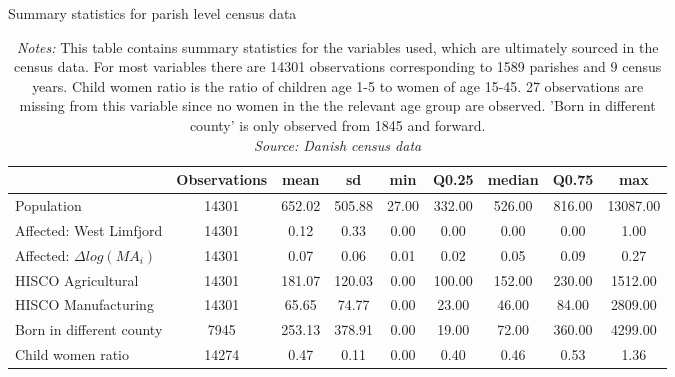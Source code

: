 \documentclass[11pt]{article}
\begin{document}
\begin{table}
\centering
\caption{Summary statistics for parish level census data}
\label{tab:desc_pop} 
\footnotesize
\begin{tabular}{lcccccccc}
\toprule
  & Observations & mean & sd & min & Q0.25 & median & Q0.75 & max\\
\midrule
Population & 14301 & 652.02 & 505.88 & 27.00 & 332.00 & 526.00 & 816.00 & 13087.00\\
Affected: West Limfjord & 14301 & 0.12 & 0.33 & 0.00 & 0.00 & 0.00 & 0.00 & 1.00\\
Affected: $\Delta log(MA_i)$ & 14301 & 0.07 & 0.06 & 0.01 & 0.02 & 0.05 & 0.09 & 0.27\\
HISCO Agricultural & 14301 & 181.07 & 120.03 & 0.00 & 100.00 & 152.00 & 230.00 & 1512.00\\
HISCO Manufacturing & 14301 & 65.65 & 74.77 & 0.00 & 23.00 & 46.00 & 84.00 & 2809.00\\
Born in different county & 7945 & 253.13 & 378.91 & 0.00 & 19.00 & 72.00 & 360.00 & 4299.00\\
Child women ratio & 14274 & 0.47 & 0.11 & 0.00 & 0.40 & 0.46 & 0.53 & 1.36\\
\bottomrule
\end{tabular}
\parbox{0.9\textwidth}{
\caption*{\footnotesize \textit{Notes:} This table contains summary statistics for the variables used, which are ultimately sourced in the census data. For most variables there are 14301 observations corresponding to 1589 parishes and 9 census years. Child women ratio is the ratio of children age 1-5 to women of age 15-45. 27 observations are missing from this variable since no women in the the relevant age group are observed. 'Born in different county' is only observed from 1845 and forward. \\ \textit{Source: Danish census data}}
}
\end{table}
\end{document}
